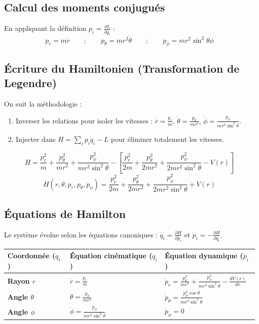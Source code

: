 \documentclass[french]{yLectureNote}
\begin{document}
\subsection{Calcul des moments conjugués}
En appliquant la définition $p_i = \frac{\partial L}{\partial \dot{q}_i}$ :
$$ p_r = m\dot{r} \qquad ; \qquad p_\theta = mr^2\dot{\theta} \qquad ; \qquad p_\phi = mr^2\sin^2\theta\dot{\phi} $$

\subsection{Écriture du Hamiltonien (Transformation de Legendre)}
On suit la méthodologie :
\begin{enumerate}
    \item Inverser les relations pour isoler les vitesses : $\dot{r} = \frac{p_r}{m}$, $\dot{\theta} = \frac{p_\theta}{mr^2}$, $\dot{\phi} = \frac{p_\phi}{mr^2\sin^2\theta}$.\\
\item Injecter dans $H = \sum_i p_i\dot{q}_i - L$ pour éliminer totalement les vitesses.
\end{enumerate}

$$ H = \frac{p_r^2}{m} + \frac{p_\theta^2}{mr^2} + \frac{p_\phi^2}{mr^2\sin^2\theta} - \left[ \frac{p_r^2}{2m} + \frac{p_\theta^2}{2mr^2} + \frac{p_\phi^2}{2mr^2\sin^2\theta} - V(r) \right] $$
$$ H(r, \theta, p_r, p_\theta, p_\phi) = \frac{p_r^2}{2m} + \frac{p_\theta^2}{2mr^2} + \frac{p_\phi^2}{2mr^2\sin^2\theta} + V(r) $$

\subsection{Équations de Hamilton}
Le système évolue selon les équations canoniques : $\dot{q}_i = \frac{\partial H}{\partial p_i}$ et $\dot{p}_i = -\frac{\partial H}{\partial q_i}$.

\begin{tabular}{lll}
\toprule
\textbf{Coordonnée ($q_i$)} & \textbf{Équation cinématique ($\dot{q}_i$)} & \textbf{Équation dynamique ($\dot{p}_i$)} \\
\midrule
\textbf{Rayon $r$} & $\displaystyle \dot{r} = \frac{p_r}{m}$ & $\displaystyle \dot{p}_r = \frac{p_\theta^2}{mr^3} + \frac{p_\phi^2}{mr^3\sin^2\theta} - \frac{dV(r)}{dr}$ \\[10pt]
\textbf{Angle $\theta$} & $\displaystyle \dot{\theta} = \frac{p_\theta}{mr^2}$ & $\displaystyle \dot{p}_\theta = \frac{p_\phi^2\cos\theta}{mr^2\sin^3\theta}$ \\[10pt]
\textbf{Angle $\phi$} & $\displaystyle \dot{\phi} = \frac{p_\phi}{mr^2\sin^2\theta}$ & $\displaystyle \dot{p}_\phi = 0$ \\
\bottomrule
\end{tabular}

\end{document}
